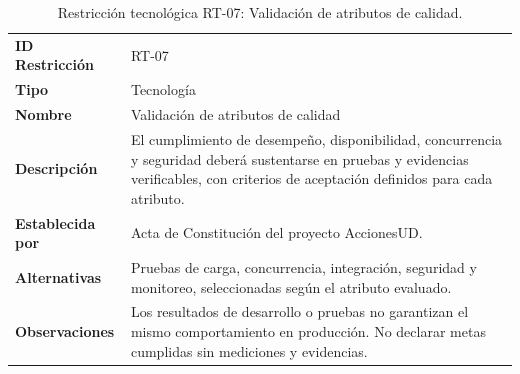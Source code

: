 \documentclass[11pt,a4paper,oneside]{article}
\begin{document}
\begingroup
\small
\setlength{\tabcolsep}{7pt}
\renewcommand{\arraystretch}{1.30}
\setlength{\anchoRegistro}{\dimexpr\textwidth-4\tabcolsep-3\arrayrulewidth\relax}
\begin{table}[H]
\centering
\caption{Restricción tecnológica RT-07: Validación de atributos de calidad.}
\label{tab:restriccion-rt-07}
\begin{tabular}{|
>{\RaggedRight\arraybackslash}p{.28\anchoRegistro}|
>{\RaggedRight\arraybackslash}p{.72\anchoRegistro}|}
\hline
\rowcolor{negroTabla}
\multicolumn{2}{|l|}{\color{white}\bfseries Registro de Restricción Tecnológica}\\\hline
\cellcolor{azulTabla}\bfseries ID Restricción
& RT-07\\\hline
\cellcolor{azulTabla}\bfseries Tipo
& Tecnología\\\hline
\cellcolor{azulTabla}\bfseries Nombre
& Validación de atributos de calidad\\\hline
\cellcolor{azulTabla}\bfseries Descripción
& El cumplimiento de desempeño, disponibilidad, concurrencia y seguridad deberá sustentarse en pruebas y evidencias verificables, con criterios de aceptación definidos para cada atributo.\\\hline
\cellcolor{azulTabla}\bfseries Establecida por
& Acta de Constitución del proyecto AccionesUD.\\\hline
\cellcolor{azulTabla}\bfseries Alternativas
& Pruebas de carga, concurrencia, integración, seguridad y monitoreo, seleccionadas según el atributo evaluado.\\\hline
\cellcolor{azulTabla}\bfseries Observaciones
& Los resultados de desarrollo o pruebas no garantizan el mismo comportamiento en producción. No declarar metas cumplidas sin mediciones y evidencias.\\\hline
\end{tabular}
\end{table}
\endgroup
\end{document}
